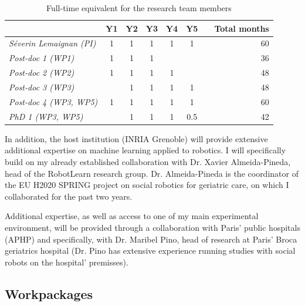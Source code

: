 \begin{table}[h!]
    \centering
\begin{tabular}{@{}lccccccr@{}}
\toprule
\textit{\textbf{}}              & \textbf{Y1} & \textbf{Y2} & \textbf{Y3} & \textbf{Y4} & \textbf{Y5} &  & \textbf{Total months} \\ \midrule
\textit{Séverin Lemaignan (PI)} & 1         & 1         & 1         & 1
    & 1         &  & 60                    \\ \midrule
\textit{Post-doc 1 (WP1)}       & 1           & 1           & 1           &             &             &  & 36                    \\
\textit{Post-doc 2 (WP2)}       & 1           & 1           & 1           & 1           &             &  & 48                    \\
\textit{Post-doc 3 (WP3)}       &             & 1           & 1           & 1           & 1           &  & 48                    \\
\textit{Post-doc 4 (WP3, WP5)}  & 1           & 1           & 1           & 1           & 1           &  & 60                    \\
\textit{PhD 1 (WP3, WP5)}       &             & 1           & 1           & 1           & 0.5         &  & 42                    \\ \bottomrule
\end{tabular}
    \caption{Full-time equivalent for the research team members}
    \label{time-allocation-team}
\end{table}


In addition, the host institution (INRIA Grenoble) will provide extensive
additional expertise on machine learning applied to robotics. I will specifically build on
my already established collaboration with Dr. Xavier Almeida-Pineda, head of the
RobotLearn research group. Dr. Almeida-Pineda is the coordinator of the EU H2020
SPRING project on social robotics for geriatric care, on which I collaborated
for the past two years.

Additional expertise, as well as access to one of my main experimental
environment, will be provided through a collaboration with Paris' public
hospitals (APHP) and specifically, with Dr. Maribel Pino, head of research at
Paris' Broca geriatrics hospital (Dr. Pino has extensive experience running
studies with social robots on the hospital' premisses).


\subsection{Workpackages}

